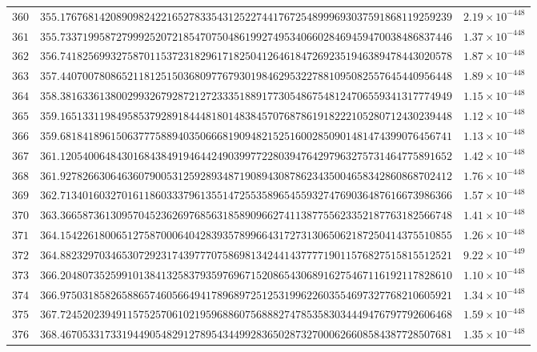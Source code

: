 \documentclass[12pt,reqno]{amsart}
\theoremstyle{remark}
\begin{document}
\begin{longtable}{clc}
$360$ & $355.1767681420890982422165278335431252274417672548999693037591868119259239$ & $2.19\times 10^{-448}$ \\
$361$ & $355.7337199587279992520721854707504861992749534066028469459470038486837446$ & $1.37\times 10^{-448}$ \\
$362$ & $356.7418256993275870115372318296171825041264618472692351946389478443020578$ & $1.87\times 10^{-448}$ \\
$363$ & $357.4407007808652118125150368097767930198462953227881095082557645440956448$ & $1.89\times 10^{-448}$ \\
$364$ & $358.3816336138002993267928721272333518891773054867548124706559341317774949$ & $1.15\times 10^{-448}$ \\
$365$ & $359.1651331198495853792891844481801483845707687861918222105280712430239448$ & $1.12\times 10^{-448}$ \\
$366$ & $359.6818418961506377758894035066681909482152516002850901481474399076456741$ & $1.13\times 10^{-448}$ \\
$367$ & $361.1205400648430168438491946442490399772280394764297963275731464775891652$ & $1.42\times 10^{-448}$ \\
$368$ & $361.9278266306463607900531259289348719089430878623435004658342860868702412$ & $1.76\times 10^{-448}$ \\
$369$ & $362.7134016032701611860333796135514725535896545593274769036487616673986366$ & $1.57\times 10^{-448}$ \\
$370$ & $363.3665873613095704523626976856318589096627411387755623352187763182566748$ & $1.41\times 10^{-448}$ \\
$371$ & $364.1542261800651275870006404283935789966431727313065062187250414375510855$ & $1.26\times 10^{-448}$ \\
$372$ & $364.8823297034653072923174397770758698134244143777719011576827515815512521$ & $9.22\times 10^{-449}$ \\
$373$ & $366.2048073525991013841325837935976967152086543068916275467116192117828610$ & $1.10\times 10^{-448}$ \\
$374$ & $366.9750318582658865746056649417896897251253199622603554697327768210605921$ & $1.34\times 10^{-448}$ \\
$375$ & $367.7245202394911575257061021959688607568882747853583034449476797792606468$ & $1.59\times 10^{-448}$ \\
$376$ & $368.4670533173319449054829127895434499283650287327000626608584387728507681$ & $1.35\times 10^{-448}$ \\

\end{longtable}
\end{document}
